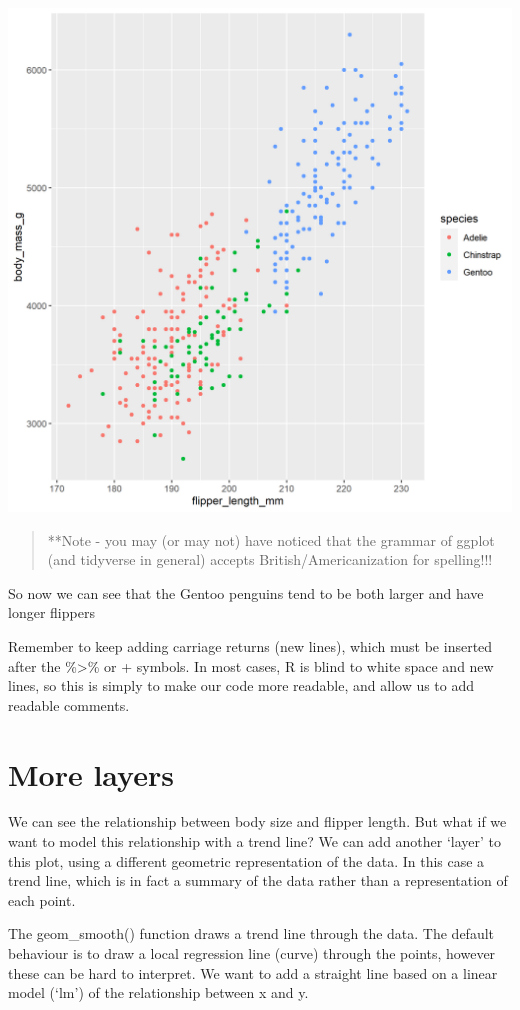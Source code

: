\documentclass[
]{book}
\begin{document}
\includegraphics[width=0.8\linewidth]{images/colourpoints}

\begin{quote}
**Note - you may (or may not) have noticed that the grammar of ggplot (and tidyverse in general) accepts British/Americanization for spelling!!!
\end{quote}

So now we can see that the Gentoo penguins tend to be both larger and have longer flippers

Remember to keep adding carriage returns (new lines), which must be inserted after the \%\textgreater\% or + symbols.
In most cases, R is blind to white space and new lines, so this is simply to make our code more readable, and allow us to add readable comments.

\hypertarget{more-layers}{%
\section{More layers}\label{more-layers}}

We can see the relationship between body size and flipper length. But what if we want to model this relationship with a trend line? We can add another `layer' to this plot, using a different geometric representation of the data. In this case a trend line, which is in fact a summary of the data rather than a representation of each point.

The geom\_smooth() function draws a trend line through the data. The default behaviour is to draw a local regression line (curve) through the points, however these can be hard to interpret. We want to add a straight line based on a linear model (`lm') of the relationship between x and y.
\end{document}
